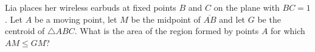 Lia places her wireless earbuds at fixed points $B$ and $C$ on the plane with $BC=1$. Let $A$ be a moving point, let $M$ be the midpoint of $\overline{AB}$ and let $G$ be the centroid of $\triangle ABC$. What is the area of the region formed by points $A$ for which $AM\leq GM$?
